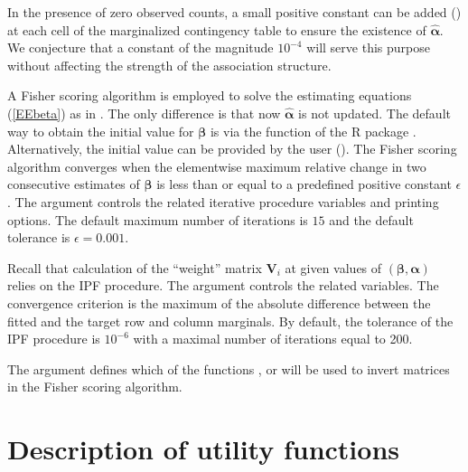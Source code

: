 \documentclass[
]{jss}
\begin{document}
In the presence of zero observed counts, a small positive constant can
be added () at each cell of the marginalized contingency table
to ensure the existence of \(\widehat{\boldsymbol \alpha}\). We
conjecture that a constant of the magnitude \(10^{-4}\) will serve this
purpose without affecting the strength of the association structure.

A Fisher scoring algorithm is employed to solve the estimating equations
(\ref{EEbeta}) as in \citet{Lipsitz1994}. The only difference is that
now \(\widehat{\boldsymbol{\alpha}}\) is not updated. The default way to
obtain the initial value for \(\boldsymbol \beta\) is via the function
 of the R package  \citep{Yee2010}. Alternatively,
the initial value can be provided by the user (). The
Fisher scoring algorithm converges when the elementwise maximum relative
change in two consecutive estimates of \(\boldsymbol \beta\) is less
than or equal to a predefined positive constant \(\epsilon\). The
 argument controls the related iterative procedure
variables and printing options. The default maximum number of iterations
is \(15\) and the default tolerance is \(\epsilon=0.001\).

Recall that calculation of the ``weight'' matrix \(\mathbf V_i\) at
given values of \((\boldsymbol \beta,\boldsymbol \alpha)\) relies on the
IPF procedure. The  argument controls the related
variables. The convergence criterion is the maximum of the absolute
difference between the fitted and the target row and column marginals.
By default, the tolerance of the IPF procedure is \(10^{-6}\) with a
maximal number of iterations equal to 200.

The  argument defines which of the  functions
,  or  will be used to invert
matrices in the Fisher scoring algorithm.

\hypertarget{Description2}{%
\section{Description of utility functions}\label{Description2}}
\end{document}
